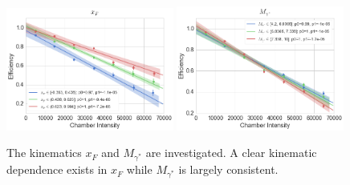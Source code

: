 \begin{figure}
	\centering
	\includegraphics[width=0.49\textwidth]{figures/analysis/xF-keff-int.png}
	\includegraphics[width=0.49\textwidth]{figures/analysis/mass-keff-int.png}
	\caption{The kinematics $x_F$ and $M_{\gamma^*}$ are investigated. A clear kinematic dependence exists in $x_F$ while $M_{\gamma^*}$ is largely consistent.}
	\label{fig:keff-mass-xf}
\end{figure}

